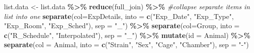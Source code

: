 \documentclass[
]{article}
\newenvironment{Shaded}{\begin{snugshade}}{\end{snugshade}}
\newcommand{\AttributeTok}[1]{\textcolor[rgb]{0.13,0.29,0.53}{#1}}
\newcommand{\CommentTok}[1]{\textcolor[rgb]{0.56,0.35,0.01}{\textit{#1}}}
\newcommand{\FunctionTok}[1]{\textcolor[rgb]{0.13,0.29,0.53}{\textbf{#1}}}
\newcommand{\NormalTok}[1]{#1}
\newcommand{\OtherTok}[1]{\textcolor[rgb]{0.56,0.35,0.01}{#1}}
\newcommand{\SpecialCharTok}[1]{\textcolor[rgb]{0.81,0.36,0.00}{\textbf{#1}}}
\newcommand{\StringTok}[1]{\textcolor[rgb]{0.31,0.60,0.02}{#1}}
\begin{document}
\begin{Shaded}
\begin{Highlighting}[]
\NormalTok{list.data }\OtherTok{\textless{}{-}}\NormalTok{ list.data }\SpecialCharTok{\%\textgreater{}\%} 
  \FunctionTok{reduce}\NormalTok{(full\_join) }\SpecialCharTok{\%\textgreater{}\%} \CommentTok{\#collapse separate items in list into one}
  \FunctionTok{separate}\NormalTok{(}\AttributeTok{col=}\NormalTok{ExpDetails, }\AttributeTok{into =} \FunctionTok{c}\NormalTok{(}\StringTok{"Exp\_Date"}\NormalTok{, }\StringTok{"Exp\_Type"}\NormalTok{, }\StringTok{"Exp\_Room"}\NormalTok{, }\StringTok{"Exp\_Sched"}\NormalTok{), }\AttributeTok{sep =} \StringTok{"\_"}\NormalTok{) }\SpecialCharTok{\%\textgreater{}\%} 
  \FunctionTok{separate}\NormalTok{(}\AttributeTok{col=}\NormalTok{Group, }\AttributeTok{into =} \FunctionTok{c}\NormalTok{(}\StringTok{"R\_Schedule"}\NormalTok{, }\StringTok{"Interpolated"}\NormalTok{), }\AttributeTok{sep =} \StringTok{"\_"}\NormalTok{) }\SpecialCharTok{\%\textgreater{}\%} 
  \FunctionTok{mutate}\NormalTok{(}\AttributeTok{id =}\NormalTok{ Animal) }\SpecialCharTok{\%\textgreater{}\%} 
  \FunctionTok{separate}\NormalTok{(}\AttributeTok{col =}\NormalTok{ Animal, }\AttributeTok{into =} \FunctionTok{c}\NormalTok{(}\StringTok{"Strain"}\NormalTok{, }\StringTok{"Sex"}\NormalTok{, }\StringTok{"Cage"}\NormalTok{, }\StringTok{"Chamber"}\NormalTok{), }\AttributeTok{sep =} \StringTok{"{-}"}\NormalTok{)}
\end{Highlighting}
\end{Shaded}
\end{document}
